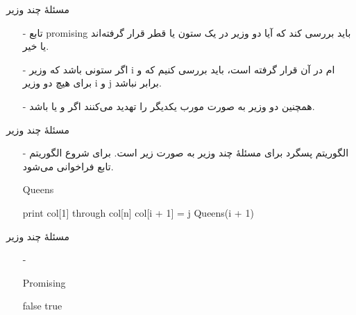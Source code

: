 \begin{frame}{مسئلهٔ چند وزیر}
\begin{itemize}\itemr
\item[-]
تابع
promising
باید بررسی کند که آیا دو وزیر در یک ستون یا قطر قرار گرفته‌اند یا خیر.
\item[-]
اگر
ستونی باشد که وزیر i ام در آن قرار گرفته است، باید بررسی کنیم که
و
برای هیچ دو وزیر i و j برابر نباشد.
\item[-]
همچنین دو وزیر به صورت مورب یکدیگر را تهدید می‌کنند اگر
و یا
باشد.
\end{itemize}
\end{frame}


\begin{frame}{مسئلهٔ چند وزیر}
\begin{itemize}\itemr
\item[-]
الگوریتم پسگرد برای مسئلهٔ چند وزیر به صورت زیر است. برای شروع الگوریتم تابع
فراخوانی می‌شود.
\begin{algorithm}[H]\alglr
  \caption{Queens} 
  \begin{algorithmic}[1]
   				\State print col[1] through col[n]
   		\Else
   		\Statex {}
   		\Statex {}
   					\State col[i + 1] = j
   					\State Queens(i + 1)	
   				\EndFor
   		\EndIf
  \EndIf                       
  \end{algorithmic}
  \label{alg:merge}
\end{algorithm}
\end{itemize}
\end{frame}


\begin{frame}{مسئلهٔ چند وزیر}
\begin{itemize}\itemr
\item[-]
\begin{algorithm}[H]\alglr
  \caption{Promising} 
  \begin{algorithmic}[1]
   \Statex  {}	
   					\State \Return false
   			\EndIf
   	\EndFor
   	\State \Return true                  
  \end{algorithmic}
  \label{alg:merge}
\end{algorithm}
\end{itemize}
\end{frame}


